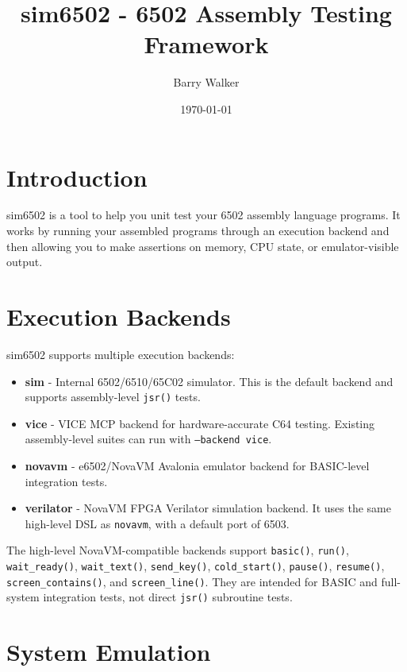 \documentclass[11pt,letterpaper]{article}
\title{sim6502 - 6502 Assembly Testing Framework}
\author{Barry Walker}
\date{\today}
\begin{document}
\maketitle

\tableofcontents
\newpage

\section{Introduction}

sim6502 is a tool to help you unit test your 6502 assembly language programs. It works by running your assembled programs through an execution backend and then allowing you to make assertions on memory, CPU state, or emulator-visible output.

\section{Execution Backends}

sim6502 supports multiple execution backends:

\begin{itemize}
    \item \textbf{sim} - Internal 6502/6510/65C02 simulator. This is the default backend and supports assembly-level \texttt{jsr()} tests.
    \item \textbf{vice} - VICE MCP backend for hardware-accurate C64 testing. Existing assembly-level suites can run with \texttt{--backend vice}.
    \item \textbf{novavm} - e6502/NovaVM Avalonia emulator backend for BASIC-level integration tests.
    \item \textbf{verilator} - NovaVM FPGA Verilator simulation backend. It uses the same high-level DSL as \texttt{novavm}, with a default port of 6503.
\end{itemize}

The high-level NovaVM-compatible backends support \texttt{basic()}, \texttt{run()}, \texttt{wait\_ready()}, \texttt{wait\_text()}, \texttt{send\_key()}, \texttt{cold\_start()}, \texttt{pause()}, \texttt{resume()}, \texttt{screen\_contains()}, and \texttt{screen\_line()}. They are intended for BASIC and full-system integration tests, not direct \texttt{jsr()} subroutine tests.

\section{System Emulation}
\end{document}
